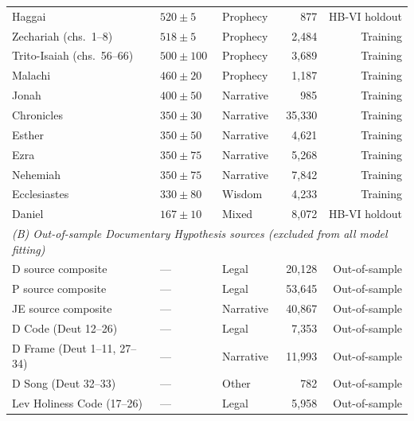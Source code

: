 \documentclass[10pt,letterpaper]{article}
\begin{document}
\begin{table}[!ht]
\begin{tabular}{lllrr}
  Haggai                                 & $520\pm5$        & Prophecy     &     877 & HB-VI holdout \\
  Zechariah (chs.\ 1--8)                 & $518\pm5$        & Prophecy     &   2,484 & Training \\
  Trito-Isaiah (chs.\ 56--66)            & $500\pm100$      & Prophecy     &   3,689 & Training \\
  Malachi                                & $460\pm20$       & Prophecy     &   1,187 & Training \\
  Jonah                                  & $400\pm50$       & Narrative    &     985 & Training \\
  Chronicles                             & $350\pm30$       & Narrative    &  35,330 & Training \\
  Esther                                 & $350\pm50$       & Narrative    &   4,621 & Training \\
  Ezra                                   & $350\pm75$       & Narrative    &   5,268 & Training \\
  Nehemiah                               & $350\pm75$       & Narrative    &   7,842 & Training \\
  Ecclesiastes                           & $330\pm80$       & Wisdom       &   4,233 & Training \\
  Daniel                                 & $167\pm10$       & Mixed        &   8,072 & HB-VI holdout \\
\hline
\multicolumn{5}{l}{\textit{(B) Out-of-sample Documentary Hypothesis sources (excluded from all model fitting)}} \\
  D source composite                     & ---              & Legal        &  20,128 & Out-of-sample \\
  P source composite                     & ---              & Legal        &  53,645 & Out-of-sample \\
  JE source composite                    & ---              & Narrative    &  40,867 & Out-of-sample \\
  D Code (Deut 12--26)                   & ---              & Legal        &   7,353 & Out-of-sample \\
  D Frame (Deut 1--11, 27--34)           & ---              & Narrative    &  11,993 & Out-of-sample \\
  D Song (Deut 32--33)                   & ---              & Other        &     782 & Out-of-sample \\
  Lev Holiness Code (17--26)             & ---              & Legal        &   5,958 & Out-of-sample \\

\end{tabular}
\end{table}
\end{document}
